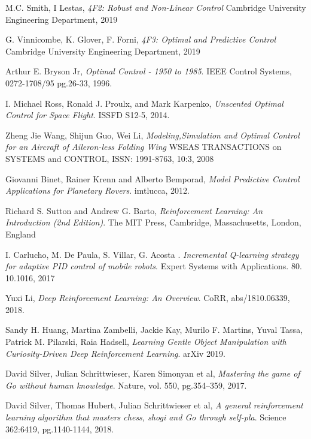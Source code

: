 \documentclass[main.tex]{subfiles}
\begin{document}
\renewcommand{\bibname}{References}
\begin{thebibliography}{9}
        M.C. Smith, I Lestas,
        \emph{4F2: Robust and Non-Linear Control}
        Cambridge University Engineering Department, 2019

        G. Vinnicombe, K. Glover, F. Forni,
        \emph{4F3: Optimal and Predictive Control}
        Cambridge University Engineering Department, 2019

        Arthur E. Bryson Jr,
        \emph{Optimal Control - 1950 to 1985}.
        IEEE Control Systems, 0272-1708/95 pg.26-33, 1996.

        I. Michael Ross, Ronald J. Proulx, and Mark Karpenko,
        \emph{Unscented Optimal Control for Space Flight}.
        ISSFD S12-5, 2014.

        Zheng Jie Wang, Shijun Guo, Wei Li,
        \emph{Modeling,Simulation and Optimal Control for an Aircraft of
        Aileron-less Folding Wing}
        WSEAS TRANSACTIONS on SYSTEMS and CONTROL, ISSN: 1991-8763, 10:3, 2008

        Giovanni Binet, Rainer Krenn and Alberto Bemporad,
        \emph{Model Predictive Control Applications for Planetary Rovers}.
        imtlucca, 2012.

        Richard S. Sutton and Andrew G. Barto,
        \emph{Reinforcement Learning: An Introduction (2nd Edition)}.
        The MIT Press, Cambridge, Massachusetts, London, England

        I. Carlucho, M. De Paula, S. Villar, G. Acosta . \emph{Incremental Q-learning strategy for adaptive PID control of mobile robots}. 
        Expert Systems with Applications. 80. 10.1016, 2017

        Yuxi Li, 
        \emph{Deep Reinforcement Learning: An Overview}. 
        CoRR, abs/1810.06339, 2018.
    
        Sandy H. Huang, Martina Zambelli, Jackie Kay, Murilo F. Martins, Yuval Tassa, Patrick M. Pilarski, Raia Hadsell,
        \emph{Learning Gentle Object Manipulation with Curiosity-Driven Deep Reinforcement Learning}.
        arXiv 2019.

        David Silver, Julian Schrittwieser, Karen Simonyan et al,
        \emph{Mastering the game of Go without human knowledge}.
        Nature, vol. 550, pg.354–359, 2017.
    
        David Silver, Thomas Hubert, Julian Schrittwieser et al, 
        \emph{A general reinforcement learning algorithm that
        masters chess, shogi and Go through self-pla}.
        Science 362:6419, pg.1140-1144, 2018.
    
\end{thebibliography}
\end{document}
